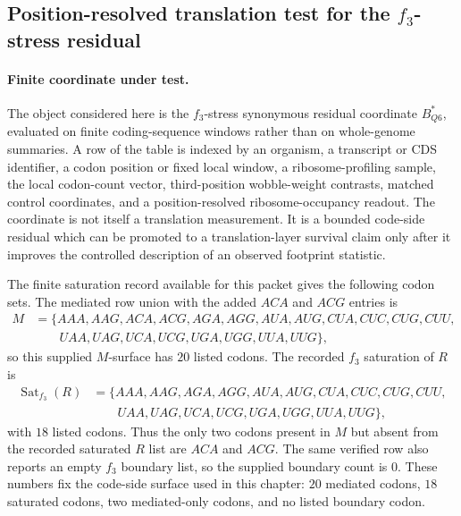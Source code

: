 \subsection{Position-resolved translation test for the $f_3$-stress residual}
\label{sec:f3-stress-position-resolved-ribosome-occupancy-translation-realization}

\paragraph{Finite coordinate under test.}
The object considered here is the $f_3$-stress synonymous residual coordinate $B^{*}_{Q6}$, evaluated on finite coding-sequence windows rather than on whole-genome summaries.  A row of the table is indexed by an organism, a transcript or CDS identifier, a codon position or fixed local window, a ribosome-profiling sample, the local codon-count vector, third-position wobble-weight contrasts, matched control coordinates, and a position-resolved ribosome-occupancy readout.  The coordinate is not itself a translation measurement.  It is a bounded code-side residual which can be promoted to a translation-layer survival claim only after it improves the controlled description of an observed footprint statistic.

The finite saturation record available for this packet gives the following codon sets.  The mediated row union with the added $ACA$ and $ACG$ entries is
$$
\begin{aligned}
M &= \{AAA,AAG,ACA,ACG,AGA,AGG,AUA,AUG,CUA,CUC,CUG,CUU,\\
&\qquad UAA,UAG,UCA,UCG,UGA,UGG,UUA,UUG\},
\end{aligned}
$$
so this supplied $M$-surface has $20$ listed codons.  The recorded $f_3$ saturation of $R$ is
$$
\begin{aligned}
\operatorname{Sat}_{f_3}(R) &= \{AAA,AAG,AGA,AGG,AUA,AUG,CUA,CUC,CUG,CUU,\\
&\qquad UAA,UAG,UCA,UCG,UGA,UGG,UUA,UUG\},
\end{aligned}
$$
with $18$ listed codons.  Thus the only two codons present in $M$ but absent from the recorded saturated $R$ list are $ACA$ and $ACG$.  The same verified row also reports an empty $f_3$ boundary list, so the supplied boundary count is $0$.  These numbers fix the code-side surface used in this chapter: $20$ mediated codons, $18$ saturated codons, two mediated-only codons, and no listed boundary codon.

